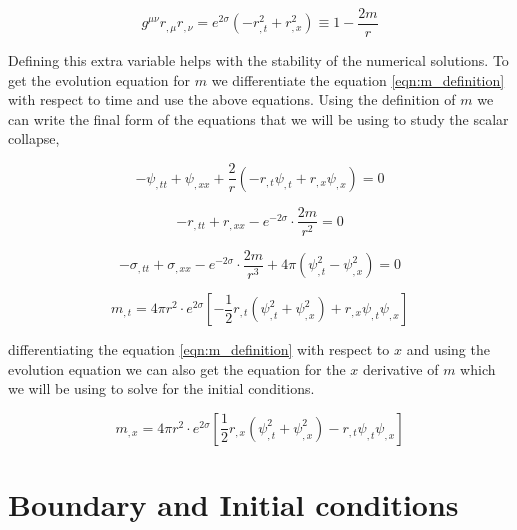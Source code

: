 \begin{equation}
    g^{\mu \nu} r_{, \mu} r_{, \nu}=e^{2 \sigma}\left(-r_{, t}^{2}+r_{, x}^{2}\right) \equiv 1-\frac{2 m}{r}
    \label{eqn:m_definition}
\end{equation}

Defining this extra variable helps with the stability of the numerical solutions.
To get the evolution equation for $m$ we differentiate the equation \ref{eqn:m_definition} with respect to time and use the above equations. Using the definition of $m$ we can write the final form of the equations that we will be using to study the scalar collapse,


\begin{equation}
    -\psi_{, t t}+\psi_{, x x}+\frac{2}{r}\left(-r_{, t} \psi_{, t}+r_{, x} \psi_{, x}\right)=0
    \label{eqn:psi}
\end{equation}

\begin{equation}
    -r_{, t t}+r_{, x x}-e^{-2 \sigma} \cdot \frac{2 m}{r^{2}}=0
    \label{eqn:r}
\end{equation}

\begin{equation}
    -\sigma_{, t t}+\sigma_{, x x}-e^{-2 \sigma} \cdot \frac{2 m}{r^{3}}+4 \pi\left(\psi_{, t}^{2}-\psi_{, x}^{2}\right)=0
    \label{eqn:sigma}
\end{equation}

\begin{equation}
    m_{, t}=4 \pi r^{2} \cdot e^{2 \sigma}\left[-\frac{1}{2} r_{, t}\left(\psi_{, t}^{2}+\psi_{, x}^{2}\right)+r_{, x} \psi_{, t} \psi_{, x}\right]
    \label{eqn:m_t}
\end{equation}


differentiating the equation \ref{eqn:m_definition} with respect to $x$ and using the evolution equation we can also get the equation for the $x$ derivative of $m$ which we will be using to solve for the initial conditions.

\begin{equation}
    m_{, x}=4 \pi r^{2} \cdot e^{2 \sigma}\left[\frac{1}{2} r_{, x}\left(\psi_{, t}^{2}+\psi_{, x}^{2}\right)-r_{, t} \psi_{, t} \psi_{, x}\right]
    \label{eqn:m_x}
\end{equation}

\section{Boundary and Initial conditions} \label{chap2:boundary_and_initial_conditions}



